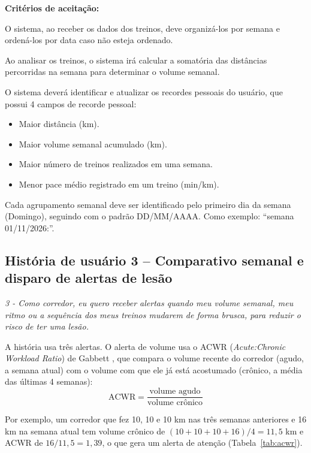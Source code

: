 \documentclass[12pt,a4paper]{article}
\newcommand{\historia}[1]{%
  \par\noindent\colorbox{caixa}{%
    \parbox{\dimexpr\linewidth-2\fboxsep\relax}{\itshape #1}}\par\medskip}
\begin{document}
\noindent\textbf{Critérios de aceitação:}
\begin{criterios}[label=\textbf{2.\arabic*:}]
  \item O sistema, ao receber os dados dos treinos, deve organizá-los por semana e
        ordená-los por data caso não esteja ordenado.
  \item Ao analisar os treinos, o sistema irá calcular a somatória das distâncias
        percorridas na semana para determinar o volume semanal.
  \item O sistema deverá identificar e atualizar os recordes pessoais do usuário, que
        possui 4 campos de recorde pessoal:
        \begin{itemize}[itemsep=0pt]
          \item Maior distância (km).
          \item Maior volume semanal acumulado (km).
          \item Maior número de treinos realizados em uma semana.
          \item Menor pace médio registrado em um treino (min/km).
        \end{itemize}
  \item Cada agrupamento semanal deve ser identificado pelo primeiro dia da semana
        (Domingo), seguindo com o padrão DD/MM/AAAA. Como exemplo: ``semana
        01/11/2026:''.
\end{criterios}

\subsection{História de usuário 3 -- Comparativo semanal e disparo de alertas de lesão}

\historia{3 - Como corredor, eu quero receber alertas quando meu volume semanal, meu
ritmo ou a sequência dos meus treinos mudarem de forma brusca, para reduzir o risco de
ter uma lesão.}

A história usa três alertas. O alerta de volume usa o ACWR (\textit{Acute:Chronic
Workload Ratio}) de Gabbett \cite{gabbett2016}, que compara o volume recente do corredor
(agudo, a semana atual) com o volume com que ele já está acostumado (crônico, a média
das últimas 4 semanas):
\[
  \text{ACWR} = \frac{\text{volume agudo}}{\text{volume crônico}}
\]

Por exemplo, um corredor que fez 10, 10 e 10 km nas três semanas anteriores e 16 km na
semana atual tem volume crônico de $(10 + 10 + 10 + 16) / 4 = 11{,}5$ km e ACWR de
$16 / 11{,}5 = 1{,}39$, o que gera um alerta de atenção (Tabela~\ref{tab:acwr}).
\end{document}
